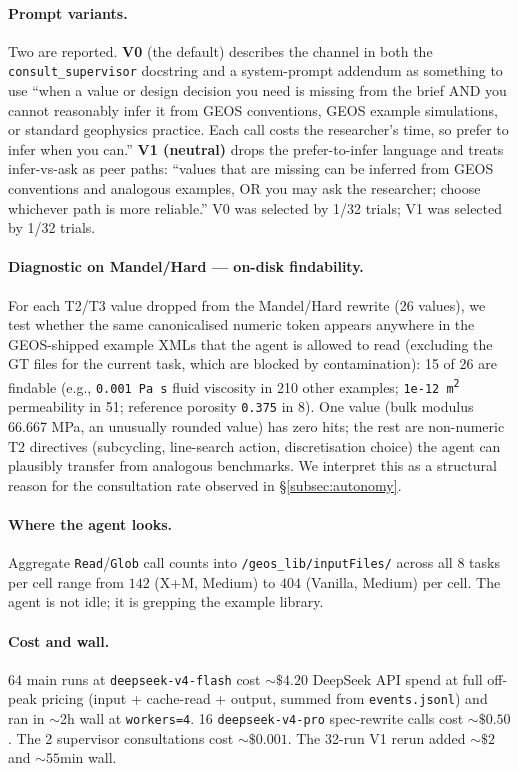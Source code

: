 \documentclass{article}
\begin{document}
\paragraph{Prompt variants.} Two are reported. \textbf{V0} (the default) describes the channel in both the \texttt{consult\_supervisor} docstring and a system-prompt addendum as something to use ``when a value or design decision you need is missing from the brief AND you cannot reasonably infer it from GEOS conventions, GEOS example simulations, or standard geophysics practice. Each call costs the researcher's time, so prefer to infer when you can.'' \textbf{V1 (neutral)} drops the prefer-to-infer language and treats infer-vs-ask as peer paths: ``values that are missing can be inferred from GEOS conventions and analogous examples, OR you may ask the researcher; choose whichever path is more reliable.'' V0 was selected by 1/32 trials; V1 was selected by 1/32 trials.

\paragraph{Diagnostic on Mandel/Hard --- on-disk findability.} For each T2/T3 value dropped from the Mandel/Hard rewrite (26 values), we test whether the same canonicalised numeric token appears anywhere in the GEOS-shipped example XMLs that the agent is allowed to read (excluding the GT files for the current task, which are blocked by contamination): 15 of 26 are findable (e.g., \texttt{0.001 Pa\,s} fluid viscosity in 210 other examples; \texttt{1e-12 m\textsuperscript{2}} permeability in 51; reference porosity \texttt{0.375} in 8). One value (bulk modulus 66.667 MPa, an unusually rounded value) has zero hits; the rest are non-numeric T2 directives (subcycling, line-search action, discretisation choice) the agent can plausibly transfer from analogous benchmarks. We interpret this as a structural reason for the consultation rate observed in \S\ref{subsec:autonomy}.

\paragraph{Where the agent looks.} Aggregate \texttt{Read}/\texttt{Glob} call counts into \texttt{/geos\_lib/inputFiles/} across all 8 tasks per cell range from $142$ (X+M, Medium) to $404$ (Vanilla, Medium) per cell. The agent is not idle; it is grepping the example library.

\paragraph{Cost and wall.} 64 main runs at \texttt{deepseek-v4-flash} cost ${\sim}\$4.20$ DeepSeek API spend at full off-peak pricing (input + cache-read + output, summed from \texttt{events.jsonl}) and ran in $\sim$2h wall at \texttt{workers=4}. 16 \texttt{deepseek-v4-pro} spec-rewrite calls cost ${\sim}\$0.50$. The 2 supervisor consultations cost ${\sim}\$0.001$. The 32-run V1 rerun added ${\sim}\$2$ and ${\sim}55$min wall.
\end{document}
